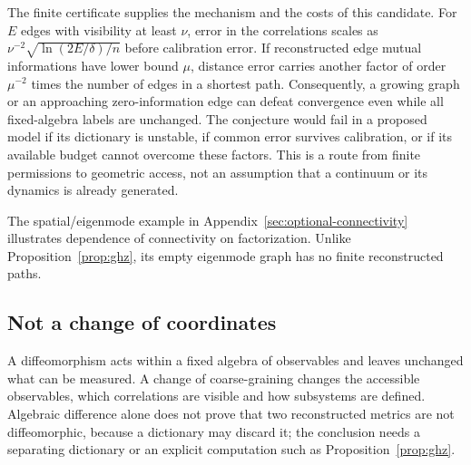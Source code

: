 \documentclass[12pt,a4paper]{article}
\begin{document}
The finite certificate supplies the mechanism and the costs of this
candidate. For $E$ edges with visibility at least $\nu$, error in
the correlations scales as
$\nu^{-2}\sqrt{\ln(2E/\delta)/n}$ before calibration error.
If reconstructed edge mutual informations have lower bound $\mu$,
distance error carries another factor of order $\mu^{-2}$ times
the number of edges in a shortest path. Consequently, a growing
graph or an approaching zero-information edge can defeat
convergence even while all fixed-algebra labels are unchanged.
The conjecture would fail in a proposed model if its dictionary is
unstable, if common error survives calibration, or if its available
budget cannot overcome these factors. This is a route from finite
permissions to geometric access, not an assumption that a continuum
or its dynamics is already generated.

The spatial/eigenmode example in Appendix~\ref{sec:optional-connectivity}
illustrates dependence of connectivity on factorization. Unlike
Proposition~\ref{prop:ghz}, its empty eigenmode graph has no finite
reconstructed paths.

\subsection{Not a change of coordinates}

A diffeomorphism acts within a fixed algebra of observables and leaves unchanged what can be measured. A change of coarse-graining changes the accessible observables, which correlations are visible and how subsystems are defined. Algebraic difference alone does not prove that two reconstructed metrics are not diffeomorphic, because a dictionary may discard it; the conclusion needs a separating dictionary or an explicit computation such as Proposition~\ref{prop:ghz}.
\end{document}
